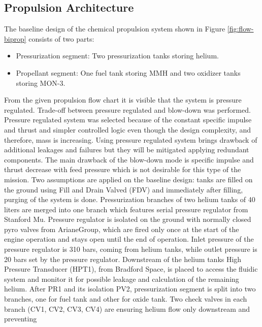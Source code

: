 \subsection{Propulsion Architecture}

The baseline design of the chemical propulsion system shown in Figure \ref{fig:flow-biprop} consists of two parts:
\begin{itemize}
    \item {Pressurization segment: Two pressurization tanks storing helium.}
    \item{Propellant segment: One fuel tank storing MMH and two oxidizer tanks storing MON-3.}
\end{itemize}
From the given propulsion flow chart it is visible that the system is pressure regulated. Trade-off between pressure regulated and blow-down was performed. Pressure regulated system was selected because of the constant specific impulse and thrust and simpler controlled logic even though the design complexity, and therefore, mass is increasing. Using pressure regulated system brings drawback of additional leakages and failures but they will be mitigated applying redundant components. The main drawback of the blow-down mode is specific impulse and thrust decrease with feed pressure which is not desirable for this type of the mission.
Two assumptions are applied on the baseline design: tanks are filled on the ground using Fill and Drain Valved (FDV) and immediately after filling, purging of the system is done. Pressurization branches of two helium tanks of 40 liters are merged into one branch which features serial pressure regulator from Stanford Mu. Pressure regulator is isolated on the ground with normally closed pyro valves from ArianeGroup, which are fired only once at the start of the engine operation and stays open until the end of operation. Inlet pressure of the pressure regulator is 310 bars, coming from helium tanks, while outlet pressure is 20 bars set by the pressure regulator. Downstream of the helium tanks High Pressure Transducer (HPT1), from Bradford Space, is placed to access the fluidic system and monitor it for possible leakage and calculation of the remaining helium. After PR1 and its isolation PV2, pressurization segment is split into two branches, one for fuel tank and other for oxide tank. Two
check valves in each branch (CV1, CV2, CV3, CV4) are ensuring helium flow only downstream and preventing
